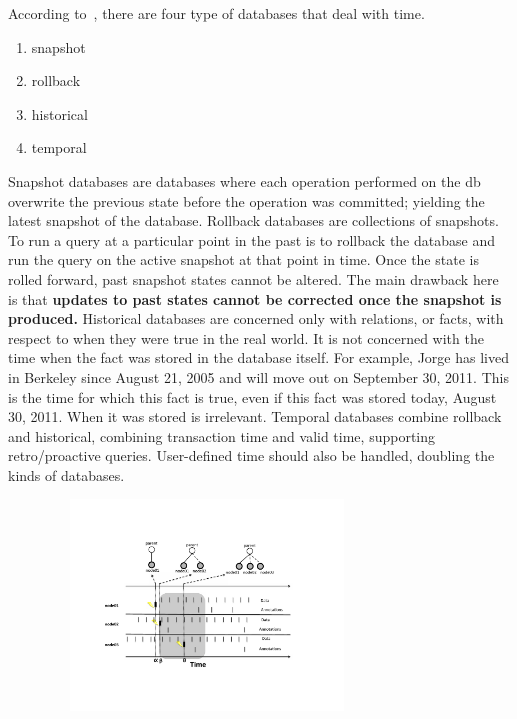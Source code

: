 According to~\cite{temporal_dbs}, there are four type of databases that deal with time.
\begin{enumerate}
\item snapshot
\item rollback
\item historical
\item temporal\\
\end{enumerate}
Snapshot databases are databases where each operation performed on the db overwrite the previous state before the operation
was committed; yielding the latest snapshot of the database.  Rollback databases are collections of snapshots.  To run a query
at a particular point in the past is to rollback the database and run the query on the active snapshot at that point in time.
Once the state is rolled forward, past snapshot states cannot be altered.  The main drawback here is that {\bf updates to past states
cannot be corrected once the snapshot is produced.}  Historical databases are concerned only with relations, or facts, with respect
to when they were true in the real world.  It is not concerned with the time when the fact was stored in the database itself.  For example,
Jorge has lived in Berkeley since August 21, 2005 and will move out on September 30, 2011.  This is the time for which this fact is true,
even if this fact was stored today, August 30, 2011.  When it was stored is irrelevant.  Temporal databases combine rollback and historical,
combining transaction time and valid time, supporting retro/proactive queries.  User-defined time should also be handled, doubling the
kinds of databases.


\begin{figure}[tb!]
\begin{center}
\includegraphics[width=0.75\textwidth,height=2.2in]{plots/mtsq}
\caption{}
\vspace*{-5mm}
\label{fig:timestitch}
\end{center}
\end{figure}


